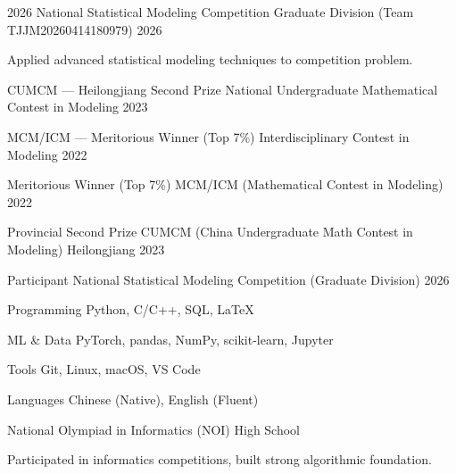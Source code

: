 \documentclass[11pt, a4paper]{awesome-cv}
\begin{document}

\begin{cventries}

  \cventry
    {2026 National Statistical Modeling Competition}
    {Graduate Division (Team TJJM20260414180979)}
    {}
    {2026}
    {
      \begin{cvitems}
        \item {Applied advanced statistical modeling techniques to competition problem.}
      \end{cvitems}
    }

  \cventry
    {CUMCM — Heilongjiang Second Prize}
    {National Undergraduate Mathematical Contest in Modeling}
    {}
    {2023}
    {
    }

  \cventry
    {MCM/ICM — Meritorious Winner (Top 7\%)}
    {Interdisciplinary Contest in Modeling}
    {}
    {2022}
    {
    }

\end{cventries}


\begin{cvhonors}

  \cvhonor
    {Meritorious Winner (Top 7\%)}
    {MCM/ICM (Mathematical Contest in Modeling)}
    {}
    {2022}

  \cvhonor
    {Provincial Second Prize}
    {CUMCM (China Undergraduate Math Contest in Modeling)}
    {Heilongjiang}
    {2023}

  \cvhonor
    {Participant}
    {National Statistical Modeling Competition (Graduate Division)}
    {}
    {2026}

\end{cvhonors}


\begin{cvskills}

  \cvskill
    {Programming}
    {Python, C/C++, SQL, LaTeX}

  \cvskill
    {ML \& Data}
    {PyTorch, pandas, NumPy, scikit-learn, Jupyter}

  \cvskill
    {Tools}
    {Git, Linux, macOS, VS Code}

  \cvskill
    {Languages}
    {Chinese (Native), English (Fluent)}

\end{cvskills}


\begin{cventries}

  \cventry
    {}
    {National Olympiad in Informatics (NOI)}
    {}
    {High School}
    {
      \begin{cvitems}
        \item {Participated in informatics competitions, built strong algorithmic foundation.}
      \end{cvitems}
    }

\end{cventries}

\end{document}
